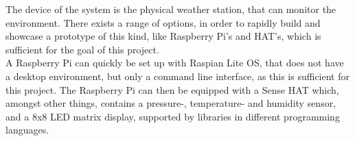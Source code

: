 The device of the system is the physical weather station, that can monitor the environment. There exists a range of options, in order to rapidly build and showcase a prototype of this kind, like Raspberry Pi's and HAT's, which is sufficient for the goal of this project.\\
A Raspberry Pi can quickly be set up with Raspian Lite OS, that does not have a desktop environment, but only a command line interface, as this is sufficient for this project. The Raspberry Pi can then be equipped with a Sense HAT which, amongst other things, contains a pressure-, temperature- and humidity sensor, and a 8x8 LED matrix display, supported by libraries in different programming languages.

